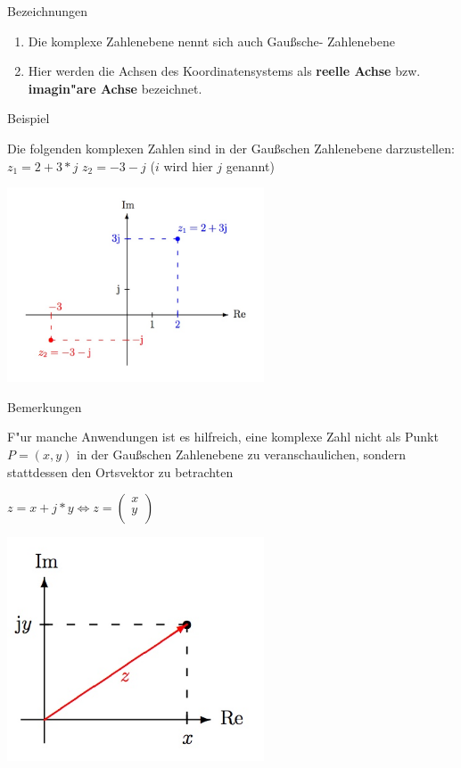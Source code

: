 		\begin{Bemerkung}
		Bezeichnungen\\
		\end{Bemerkung}

		\begin{enumerate}
		\item Die komplexe Zahlenebene nennt sich auch Gaußsche- Zahlenebene
		\item Hier werden die Achsen des Koordinatensystems als \textbf{reelle Achse} bzw. \textbf{imagin"are Achse} bezeichnet.\\
		\end{enumerate}

		\begin{Bemerkung}
		Beispiel\\
		\end{Bemerkung}

		Die folgenden komplexen Zahlen sind in der Gaußschen Zahlenebene darzustellen: \\
		$z_{1} = 2+3*j$  $z_{2} =-3-j$ ($i$ wird hier $j$ genannt)

		\includegraphics[width=3in]{kap6/komplexezahlen2}

		\begin{Bemerkung}
		Bemerkungen\\
		\end{Bemerkung}

		F"ur manche Anwendungen ist es hilfreich, eine komplexe Zahl nicht als Punkt $P=(x,y)$ in der Gaußschen Zahlenebene zu veranschaulichen, sondern stattdessen den Ortsvektor zu betrachten

		$z=x+j*y \Leftrightarrow z=
		\begin{pmatrix}
		x\\
		y\\
		\end{pmatrix}$

		\includegraphics[width=3in]{kap6/komplexezahlen3}

